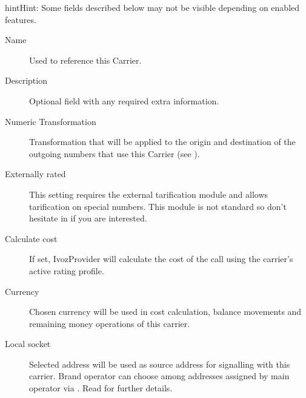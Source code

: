 \documentclass[letterpaper,10pt,english]{sphinxmanual}
\begin{document}
\begin{notice}{hint}{Hint:}
Some fields described below may not be visible depending on enabled features.
\end{notice}
\begin{description}
\item[{Name}] \leavevmode{}\label{administration_portal/brand/providers/carriers:term-name}
Used to reference this Carrier.

\item[{Description}] \leavevmode{}\label{administration_portal/brand/providers/carriers:term-description}
Optional field with any required extra information.

\item[{Numeric Transformation}] \leavevmode{}\label{administration_portal/brand/providers/carriers:term-numeric-transformation}
Transformation that will be applied to the origin and destination of the
outgoing numbers that use this Carrier
(see {\hyperref[administration_portal/brand/settings/numeric_transformations:numeric\string-transformations]{}}).

\item[{Externally rated}] \leavevmode{}\label{administration_portal/brand/providers/carriers:term-externally-rated}
This setting requires the external tarification module and allows
tarification on special numbers. This module is not standard so don't
hesitate in {\hyperref[basic_concepts/intro/getting_help:getting\string-help]{}} if you are interested.

\item[{Calculate cost}] \leavevmode{}\label{administration_portal/brand/providers/carriers:term-calculate-cost}
If set, IvozProvider will calculate the cost of the call using the carrier's active rating profile.

\item[{Currency}] \leavevmode{}\label{administration_portal/brand/providers/carriers:term-currency}
Chosen currency will be used in cost calculation, balance movements and
remaining money operations of this carrier.

\item[{Local socket}] \leavevmode{}\label{administration_portal/brand/providers/carriers:term-local-socket}
Selected address will be used as source address for signalling with this carrier. Brand operator can choose among
addresses assigned by main operator via {\hyperref[administration_portal/platform/brands:brands]{}}. Read {\hyperref[administration_portal/platform/infrastructure/proxy_trunks:proxy\string-trunks]{}} for further details.


\end{description}
\end{document}
